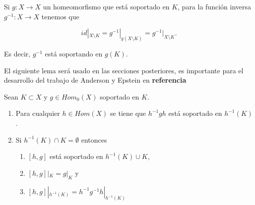 \begin{ob} \label{ob:sop_fun_inversa}
Si $g:X \to X$ un homeomorfismo que está soportado en $K$, para la función inversa $g^{-1}:X \to X$ tenemos que 

$$id|_{X \setminus K}=g^{-1}|_{g(X \setminus K)}=g^{-1}|_{X \setminus K}.$$

 Es decir, $g^{-1}$ está soportando en $g(K).$
\end{ob}
El siguiente lema será usado en las secciones posteriores, es importante para el desarrollo del trabajo de Anderson y Epstein en \textbf{referencia}

\begin{lm}\label{lm:obs_a}
 Sean $K \subset X$ y $g \in Hom_0(X)$ soportado en $K$.
 
	\begin{enumerate}
		\item Para cualquier $h \in Hom(X)$ se tiene que $h^{-1}gh$ está soportado en $h^{-1}(K)$.
		\item Si $h^{-1}(K) \cap K = \emptyset$ entonces
			\begin{enumerate}
				\item $[h,g]$ está soportado en $h^{-1}(K) \cup K$,
				\item $[h,g]|_K=g|_K$ y 
				\item $[h,g]|_{h^{-1}(K)}=h^{-1}g^{-1}h|_{h^{-1}(K)}$
			\end{enumerate}	
	\end{enumerate}
\end{lm}
	
